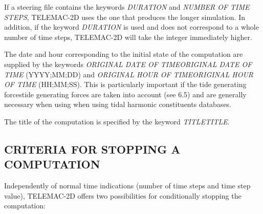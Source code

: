 \documentclass{article} %
\begin{document}
 If a steering file contains the keywords \textit{DURATION} and \textit{NUMBER OF TIME STEPS}, TELEMAC-2D uses the one that produces the longer simulation. In addition, if the keyword \textit{DURATION} is used and does not correspond to a whole number of time steps, TELEMAC-2D will take the integer immediately higher.

 The date and hour corresponding to the initial state of the computation are supplied by the keywords \textit{ORIGINAL DATE OF TIMEORIGINAL DATE OF TIME} (YYYY;MM;DD) and \textit{ORIGINAL HOUR OF TIMEORIGINAL HOUR OF TIME} (HH;MM;SS). This is particularly important if the tide generating forcestide generating forces are taken into account (see 6.5) and are generally necessary when using when using tidal harmonic constituents databases.

 The title of the computation is specified by the keyword \textit{TITLETITLE}.


\subsection{ CRITERIA FOR STOPPING A COMPUTATION}

 Independently of normal time indications (number of time steps and time step value), TELEMAC-2D offers two possibilities for conditionally stopping the computation:
\end{document}
